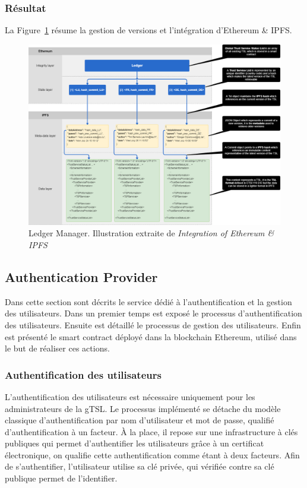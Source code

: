 \documentclass{tnreport}
\begin{document}
\subsubsection{Résultat}

La Figure~\ref{fig:versioning} résume la gestion de versions et l'intégration d'Ethereum \& IPFS.

\clearpage

\begin{figure}[h]
	\centering
	\includegraphics[scale=0.35]{figures/versioning}
	\caption{Ledger Manager. Illustration extraite de \textit{Integration of Ethereum \& IPFS}~\cite{ipfs-ethereum}}
	\label{fig:versioning}
\end{figure}

\subsection{Authentication Provider}
\label{sec:authentication}

Dans cette section sont décrits le service dédié à l'authentification et la gestion des utilisateurs. Dans un premier temps est exposé le processus d'authentification des utilisateurs. Ensuite est détaillé le processus de gestion des utilisateurs. Enfin est présenté le smart contract déployé dans la blockchain Ethereum, utilisé dans le but de réaliser ces actions.

\subsubsection{Authentification des utilisateurs}

L'authentification des utilisateurs est nécessaire uniquement pour les administrateurs de la gTSL. Le processus implémenté se détache du modèle classique d'authentification par nom d'utilisateur et mot de passe, qualifié d'authentification à un facteur. À la place, il repose sur une infrastructure à clés publiques qui permet d'authentifier les utilisateurs grâce à un certificat électronique, on qualifie cette authentification comme étant à deux facteurs. Afin de s'authentifier, l'utilisateur utilise sa clé privée, qui vérifiée contre sa clé publique permet de l'identifier.
\end{document}
